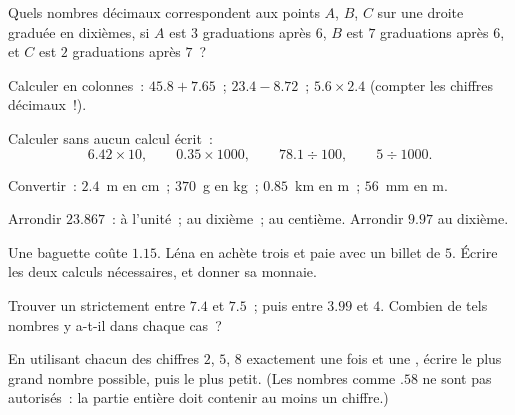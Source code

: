 \begin{exercise}[$\star$]\label{exo:g6:decimals:5}
Quels nombres décimaux correspondent aux points $A$, $B$, $C$ sur une
droite graduée en dixièmes, si $A$ est $3$ graduations après $6$, $B$
est $7$ graduations après $6$, et $C$ est $2$ graduations après $7$~?
\end{exercise}

\begin{exercise}[$\star$]\label{exo:g6:decimals:6}
Calculer en colonnes~: $45.8 + 7.65$~; \quad $23.4 - 8.72$~; \quad
$5.6 \times 2.4$ (compter les chiffres décimaux~!).
\end{exercise}

\begin{exercise}[$\star$]\label{exo:g6:decimals:7}
Calculer sans aucun calcul écrit~:
\[
6.42 \times 10, \qquad
0.35 \times 1000, \qquad
78.1 \div 100, \qquad
5 \div 1000 .
\]
\end{exercise}

\begin{exercise}[$\star$]\label{exo:g6:decimals:8}
Convertir~: $2.4$~m en cm~; \quad $370$~g en kg~; \quad $0.85$~km en
m~; \quad $56$~mm en m.
\end{exercise}

\begin{exercise}[$\star$]\label{exo:g6:decimals:9}
Arrondir $23.867$~: à l'unité~; au dixième~; au centième. Arrondir
$9.97$ au dixième.
\end{exercise}

\begin{exercise}[$\star\star$]\label{exo:g6:decimals:10}
Une baguette coûte $1.15$. Léna en achète trois et paie avec un billet
de $5$. Écrire les deux calculs nécessaires, et donner sa monnaie.
\end{exercise}

\begin{exercise}[$\star\star$]\label{exo:g6:decimals:11}
Trouver un  strictement entre $7.4$ et $7.5$~; puis
entre $3.99$ et $4$. Combien de tels nombres y a-t-il dans chaque
cas~?
\end{exercise}

\begin{exercise}[$\star\star\star$]\label{exo:g6:decimals:12}
En utilisant chacun des chiffres $2$, $5$, $8$ exactement une fois et
une , écrire le plus grand nombre possible, puis le plus
petit. (Les nombres comme $.58$ ne sont pas autorisés~: la partie
entière doit contenir au moins un chiffre.)
\end{exercise}

